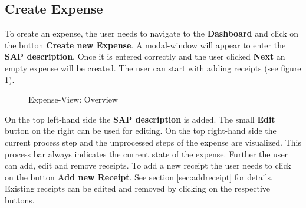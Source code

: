 \subsection{Create Expense}

To create an expense, the user needs to navigate to the \textbf{Dashboard} and click on the button \textbf{Create new Expense}. A modal-window will appear to enter the \textbf{SAP description}. Once it is entered correctly and the user clicked \textbf{Next} an empty expense will be created. The user can start with adding receipts (see figure \ref{fig:expensesitems-overview}).

\begin{figure}[H]
    \centering
    \caption{Expense-View: Overview}
    \label{fig:expensesitems-overview}
\end{figure}

On the top left-hand side the \textbf{SAP description} is added. The small \textbf{Edit} button on the right can be used for editing. On the top right-hand side the current process step and the unprocessed steps of the expense are visualized. This process bar always indicates the current state of the expense.\newline
Further the user can add, edit and remove receipts. To add a new receipt the user needs to click on the button \textbf{Add new Receipt}. See section \ref{sec:addreceipt} for details. \newline
Existing receipts can be edited and removed by clicking on the respective buttons.


